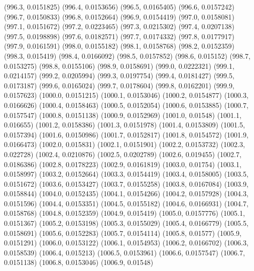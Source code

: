 {					(996.3, 0.0151825)
					(996.4, 0.0153656)
					(996.5, 0.0165405)
					(996.6, 0.0157242)
					(996.7, 0.0150833)
					(996.8, 0.0152664)
					(996.9, 0.0154419)
					(997.0, 0.0158081)
					(997.1, 0.0151672)
					(997.2, 0.0223465)
					(997.3, 0.0215302)
					(997.4, 0.0207138)
					(997.5, 0.0198898)
					(997.6, 0.0182571)
					(997.7, 0.0174332)
					(997.8, 0.0177917)
					(997.9, 0.0161591)
					(998.0, 0.0155182)
					(998.1, 0.0158768)
					(998.2, 0.0152359)
					(998.3, 0.015419)
					(998.4, 0.0166092)
					(998.5, 0.0157852)
					(998.6, 0.015152)
					(998.7, 0.0153275)
					(998.8, 0.0155106)
					(998.9, 0.0158691)
					(999.0, 0.0222321)
					(999.1, 0.0214157)
					(999.2, 0.0205994)
					(999.3, 0.0197754)
					(999.4, 0.0181427)
					(999.5, 0.0173187)
					(999.6, 0.0165024)
					(999.7, 0.0178604)
					(999.8, 0.0162201)
					(999.9, 0.0157623)
					(1000.0, 0.0151215)
					(1000.1, 0.0153046)
					(1000.2, 0.0154877)
					(1000.3, 0.0166626)
					(1000.4, 0.0158463)
					(1000.5, 0.0152054)
					(1000.6, 0.0153885)
					(1000.7, 0.0157547)
					(1000.8, 0.0151138)
					(1000.9, 0.0152969)
					(1001.0, 0.01548)
					(1001.1, 0.016655)
					(1001.2, 0.0158386)
					(1001.3, 0.0151978)
					(1001.4, 0.0153809)
					(1001.5, 0.0157394)
					(1001.6, 0.0150986)
					(1001.7, 0.0152817)
					(1001.8, 0.0154572)
					(1001.9, 0.0166473)
					(1002.0, 0.015831)
					(1002.1, 0.0151901)
					(1002.2, 0.0153732)
					(1002.3, 0.022728)
					(1002.4, 0.0210876)
					(1002.5, 0.0202789)
					(1002.6, 0.019455)
					(1002.7, 0.0186386)
					(1002.8, 0.0178223)
					(1002.9, 0.0161819)
					(1003.0, 0.01754)
					(1003.1, 0.0158997)
					(1003.2, 0.0152664)
					(1003.3, 0.0154419)
					(1003.4, 0.0158005)
					(1003.5, 0.0151672)
					(1003.6, 0.0153427)
					(1003.7, 0.0155258)
					(1003.8, 0.0167084)
					(1003.9, 0.0158844)
					(1004.0, 0.0152435)
					(1004.1, 0.0154266)
					(1004.2, 0.0157928)
					(1004.3, 0.0151596)
					(1004.4, 0.0153351)
					(1004.5, 0.0155182)
					(1004.6, 0.0166931)
					(1004.7, 0.0158768)
					(1004.8, 0.0152359)
					(1004.9, 0.015419)
					(1005.0, 0.0157776)
					(1005.1, 0.0151367)
					(1005.2, 0.0153198)
					(1005.3, 0.0155029)
					(1005.4, 0.0166779)
					(1005.5, 0.0158691)
					(1005.6, 0.0152283)
					(1005.7, 0.0154114)
					(1005.8, 0.01577)
					(1005.9, 0.0151291)
					(1006.0, 0.0153122)
					(1006.1, 0.0154953)
					(1006.2, 0.0166702)
					(1006.3, 0.0158539)
					(1006.4, 0.015213)
					(1006.5, 0.0153961)
					(1006.6, 0.0157547)
					(1006.7, 0.0151138)
					(1006.8, 0.0153046)
					(1006.9, 0.01548)
}
